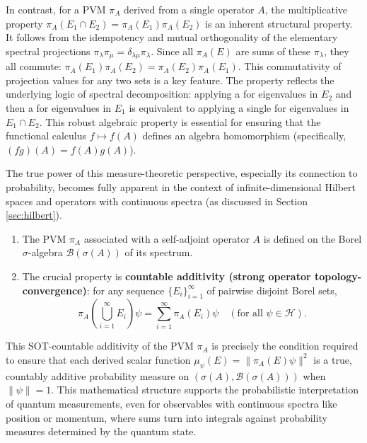 In contrast, for a PVM $\pi_A$ derived from a single operator $A$, the multiplicative property $\pi_A(E_1 \cap E_2) = \pi_A(E_1)\pi_A(E_2)$ is an inherent structural property. It follows from the idempotency and mutual orthogonality of the elementary spectral projections $\pi_\lambda \pi_\mu = \delta_{\lambda\mu}\pi_\lambda$. Since all $\pi_A(E)$ are sums of these $\pi_\lambda$, they all commute: $\pi_A(E_1)\pi_A(E_2) = \pi_A(E_2)\pi_A(E_1)$. This commutativity of projection values for any two sets is a key feature. The property reflects the underlying logic of spectral decomposition: applying a  for eigenvalues in $E_2$ and then a  for eigenvalues in $E_1$ is equivalent to applying a single  for eigenvalues in $E_1 \cap E_2$. This robust algebraic property is essential for ensuring that the functional calculus $f \mapsto f(A)$ defines an algebra homomorphism (specifically, $(fg)(A)=f(A)g(A)$).

The true power of this measure-theoretic perspective, especially its connection to probability, becomes fully apparent in the context of infinite-dimensional Hilbert spaces and operators with continuous spectra (as discussed in Section \ref{sec:hilbert}).
\begin{enumerate}
    \item The PVM $\pi_A$ associated with a self-adjoint operator $A$ is defined on the Borel $\sigma$-algebra $\mathcal{B}(\sigma(A))$ of its spectrum.
    \item The crucial property is \textbf{countable additivity (strong operator topology-convergence)}: for any sequence $\{E_i\}_{i=1}^\infty$ of pairwise disjoint Borel sets,
        \[ \pi_A\left(\bigcup_{i=1}^\infty E_i\right)\psi = \sum_{i=1}^\infty \pi_A(E_i)\psi \quad (\text{for all } \psi \in \mathcal{H}). \]
\end{enumerate}
This SOT-countable additivity of the PVM $\pi_A$ is precisely the condition required to ensure that each derived scalar function $\mu_\psi(E) = \|\pi_A(E)\psi\|^2$ is a true, countably additive probability measure on $(\sigma(A), \mathcal{B}(\sigma(A)))$ when $\|\psi\|=1$. This mathematical structure supports the probabilistic interpretation of quantum measurements, even for observables with continuous spectra like position or momentum, where sums turn into integrals against probability measures determined by the quantum state.


